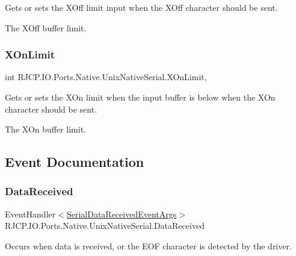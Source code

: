 Gets or sets the X\+Off limit input when the X\+Off character should be sent. 

The X\+Off buffer limit. \mbox{\label{class_r_j_c_p_1_1_i_o_1_1_ports_1_1_native_1_1_unix_native_serial_ae9ce2190791a37c339f63b397d0301ef}} 
\subsubsection{\texorpdfstring{XOnLimit}{XOnLimit}}
{\footnotesize\ttfamily int R\+J\+C\+P.\+I\+O.\+Ports.\+Native.\+Unix\+Native\+Serial.\+X\+On\+Limit\hspace{0.3cm}{\ttfamily [get]}, {\ttfamily [set]}}



Gets or sets the X\+On limit when the input buffer is below when the X\+On character should be sent. 

The X\+On buffer limit. 

\subsection{Event Documentation}
\mbox{\label{class_r_j_c_p_1_1_i_o_1_1_ports_1_1_native_1_1_unix_native_serial_adc08f33b7d8b09ea7e2a92cb9609b554}} 
\subsubsection{\texorpdfstring{DataReceived}{DataReceived}}
{\footnotesize\ttfamily Event\+Handler$<$\mbox{\hyperlink{class_r_j_c_p_1_1_i_o_1_1_ports_1_1_serial_data_received_event_args}{Serial\+Data\+Received\+Event\+Args}}$>$ R\+J\+C\+P.\+I\+O.\+Ports.\+Native.\+Unix\+Native\+Serial.\+Data\+Received}



Occurs when data is received, or the E\+OF character is detected by the driver. 

